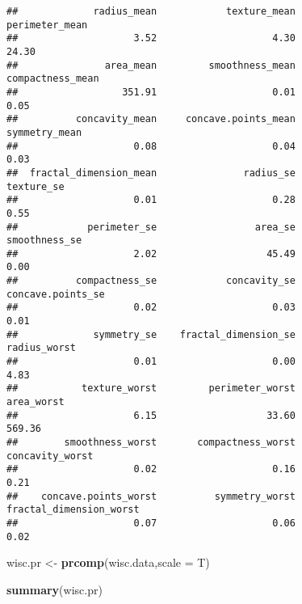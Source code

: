 \documentclass[
]{article}
\newenvironment{Shaded}{\begin{snugshade}}{\end{snugshade}}
\newcommand{\DataTypeTok}[1]{\textcolor[rgb]{0.13,0.29,0.53}{#1}}
\newcommand{\KeywordTok}[1]{\textcolor[rgb]{0.13,0.29,0.53}{\textbf{#1}}}
\newcommand{\NormalTok}[1]{#1}
\newcommand{\StringTok}[1]{\textcolor[rgb]{0.31,0.60,0.02}{#1}}
\begin{document}
\begin{verbatim}
##             radius_mean            texture_mean          perimeter_mean 
##                    3.52                    4.30                   24.30 
##               area_mean         smoothness_mean        compactness_mean 
##                  351.91                    0.01                    0.05 
##          concavity_mean     concave.points_mean           symmetry_mean 
##                    0.08                    0.04                    0.03 
##  fractal_dimension_mean               radius_se              texture_se 
##                    0.01                    0.28                    0.55 
##            perimeter_se                 area_se           smoothness_se 
##                    2.02                   45.49                    0.00 
##          compactness_se            concavity_se       concave.points_se 
##                    0.02                    0.03                    0.01 
##             symmetry_se    fractal_dimension_se            radius_worst 
##                    0.01                    0.00                    4.83 
##           texture_worst         perimeter_worst              area_worst 
##                    6.15                   33.60                  569.36 
##        smoothness_worst       compactness_worst         concavity_worst 
##                    0.02                    0.16                    0.21 
##    concave.points_worst          symmetry_worst fractal_dimension_worst 
##                    0.07                    0.06                    0.02
\end{verbatim}

\begin{Shaded}
\begin{Highlighting}[]
\NormalTok{wisc.pr <-}\StringTok{ }\KeywordTok{prcomp}\NormalTok{(wisc.data,}\DataTypeTok{scale =}\NormalTok{ T)}
\end{Highlighting}
\end{Shaded}

\begin{Shaded}
\begin{Highlighting}[]
\KeywordTok{summary}\NormalTok{(wisc.pr)}
\end{Highlighting}
\end{Shaded}
\end{document}
